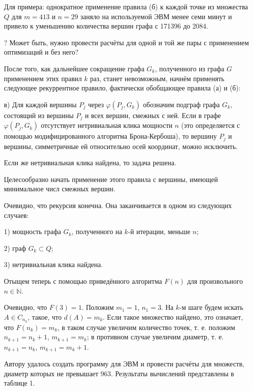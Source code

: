 \documentclass{article}
\begin{document}
Для примера: однократное применение правила (б) к каждой точке из множества $Q$ для $m=413$ и $n=29$ заняло на используемой ЭВМ менее семи минут и привело к уменьшению количества вершин графа с 171396 до 2084.

? Может быть, нужно провести расчёты для одной и той же пары с применением оптимизаций и без него?

После того, как дальнейшее сокращение графа $G_k$, полученного из графа $G$ применением этих правил $k$ раз, станет невозможным, начнём применять следующее рекуррентное правило, фактически обобщающее правила (а) и (б):

в)
Для каждой вершины $P_j$ через $\varphi(P_j,G_k)$ обозначим подграф графа $G_k$, состоящий из вершины $P_j$ и всех вершин, смежных с ней.
Если в графе $\varphi(P_j,G_k)$ отсутствует нетривиальная клика мощности $n$ (это определяется с помощью модифицированного алгоритма Брона-Кербоша), то вершину $P_j$ и вершины, симметричные ей относительно осей координат, можно исключить.

Если же нетривиальная клика найдена, то задача решена.

Целесообразно начать применение этого правила с вершины, имеющей минимальное числ смежных вершин.

Очевидно, что рекурсия конечна.
Она заканчивается в одном из следующих случаев:

1) мощность графа $G_k$, полученного на $k$-й итерации, меньше $n$;

2) граф $G_k \subset Q$;

3) нетривиальная клика найдена.



Отыщем теперь с помощью приведённого алгоритма $F(n)$ для произвольного $n \in \mathbb{N}$.

Очевидно, что $F(3) = 1$.
Положим $m_1=1$, $n_1=3$.
На $k$-м шаге будем искать $A \in C_{n_k}$, такое, что $d(A) = m_k$.
Если такое множество найдено, это означает, что $F(n_k)=m_k$,
в таком случае увеличим количество точек, т. е. положим $n_{k+1} = n_k +1$, $m_{k+1} = m_k$;
в противном случае увеличим диаметр, т. е. $n_{k+1} = n_k$, $m_{k+1} = m_k +1$.



Автору удалось создать программу для ЭВМ и провести расчёты для множеств, диаметр которых не превышает 963.
Результаты вычислений представлены в таблице 1.
\end{document}
